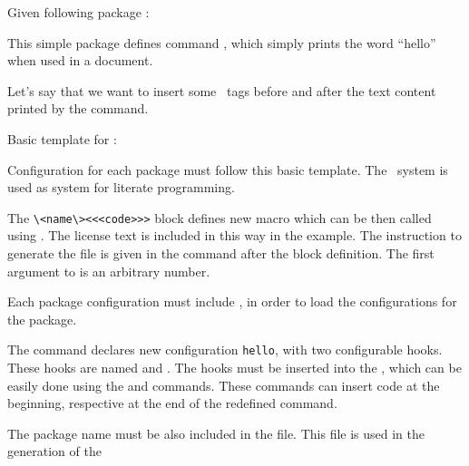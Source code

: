 Given following package :


This simple package defines command \texcommand{\hello}, which simply prints the word \enquote{hello} when used in a document.

Let's say that we want to insert some \HTML\ tags before and after the text content printed by the command.

Basic template for :


Configuration for each package must follow this basic template. The \ProTeX\ system is used as system for literate programming.

The \verb|\<name\><<<code>>>| block defines new macro which can be then called using . The license text
is included in this way in the example. The instruction to generate the  file is given in the 
command  after the block definition. The first argument to  is an arbitrary number.


Each package configuration  must include , in order to load the configurations for the package.

The command  declares new configuration \texttt{hello}, with two configurable hooks. 
These hooks are named   and . The hooks must be inserted into the 
\texcommand{\hello}, which can be easily done using the  and  commands. These
commands can insert code  at the beginning, respective at the end of the redefined command.

The package name must be also included in the  file. This file is used in the generation of the 

\begin{texsource}
\end{texsource}

